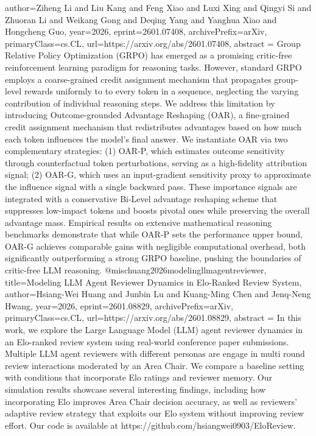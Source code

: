 {      author={Ziheng Li and Liu Kang and Feng Xiao and Luxi Xing and Qingyi Si and Zhuoran Li and Weikang Gong and Deqing Yang and Yanghua Xiao and Hongcheng Guo},
      year={2026},
      eprint={2601.07408},
      archivePrefix={arXiv},
      primaryClass={cs.CL},
      url={https://arxiv.org/abs/2601.07408},
      abstract = {Group Relative Policy Optimization (GRPO) has emerged as a promising critic-free reinforcement learning paradigm for reasoning tasks. However, standard GRPO employs a coarse-grained credit assignment mechanism that propagates group-level rewards uniformly to to every token in a sequence, neglecting the varying contribution of individual reasoning steps. We address this limitation by introducing Outcome-grounded Advantage Reshaping (OAR), a fine-grained credit assignment mechanism that redistributes advantages based on how much each token influences the model's final answer. We instantiate OAR via two complementary strategies: (1) OAR-P, which estimates outcome sensitivity through counterfactual token perturbations, serving as a high-fidelity attribution signal; (2) OAR-G, which uses an input-gradient sensitivity proxy to approximate the influence signal with a single backward pass. These importance signals are integrated with a conservative Bi-Level advantage reshaping scheme that suppresses low-impact tokens and boosts pivotal ones while preserving the overall advantage mass. Empirical results on extensive mathematical reasoning benchmarks demonstrate that while OAR-P sets the performance upper bound, OAR-G achieves comparable gains with negligible computational overhead, both significantly outperforming a strong GRPO baseline, pushing the boundaries of critic-free LLM reasoning.}
}@misc{huang2026modelingllmagentreviewer,
      title={Modeling LLM Agent Reviewer Dynamics in Elo-Ranked Review System}, 
      author={Hsiang-Wei Huang and Junbin Lu and Kuang-Ming Chen and Jenq-Neng Hwang},
      year={2026},
      eprint={2601.08829},
      archivePrefix={arXiv},
      primaryClass={cs.CL},
      url={https://arxiv.org/abs/2601.08829},
      abstract = {In this work, we explore the Large Language Model (LLM) agent reviewer dynamics in an Elo-ranked review system using real-world conference paper submissions. Multiple LLM agent reviewers with different personas are engage in multi round review interactions moderated by an Area Chair. We compare a baseline setting with conditions that incorporate Elo ratings and reviewer memory. Our simulation results showcase several interesting findings, including how incorporating Elo improves Area Chair decision accuracy, as well as reviewers' adaptive review strategy that exploits our Elo system without improving review effort. Our code is available at https://github.com/hsiangwei0903/EloReview.}
}
